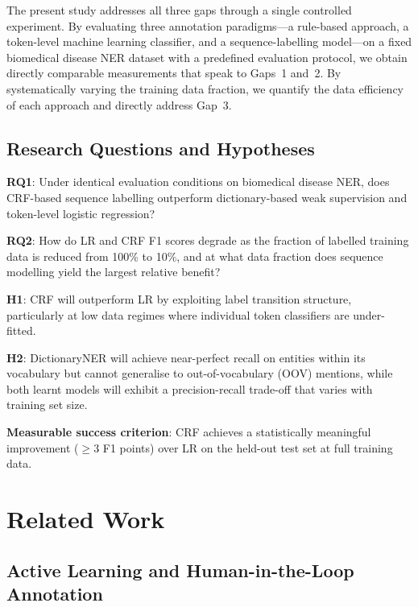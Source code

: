 \documentclass[sigconf,nonacm]{acmart}
\begin{document}
The present study addresses all three gaps through a single controlled experiment. By evaluating three annotation paradigms---a rule-based approach, a token-level machine learning classifier, and a sequence-labelling model---on a fixed biomedical disease NER dataset with a predefined evaluation protocol, we obtain directly comparable measurements that speak to Gaps~1 and~2. By systematically varying the training data fraction, we quantify the data efficiency of each approach and directly address Gap~3.

\subsection{Research Questions and Hypotheses}

\textbf{RQ1}: Under identical evaluation conditions on biomedical disease NER, does CRF-based sequence labelling outperform dictionary-based weak supervision and token-level logistic regression?

\textbf{RQ2}: How do LR and CRF F1 scores degrade as the fraction of labelled training data is reduced from 100\% to 10\%, and at what data fraction does sequence modelling yield the largest relative benefit?

\textbf{H1}: CRF will outperform LR by exploiting label transition structure, particularly at low data regimes where individual token classifiers are under-fitted.

\textbf{H2}: DictionaryNER will achieve near-perfect recall on entities within its vocabulary but cannot generalise to out-of-vocabulary (OOV) mentions, while both learnt models will exhibit a precision-recall trade-off that varies with training set size.

\textbf{Measurable success criterion}: CRF achieves a statistically meaningful improvement ($\geq$3 F1 points) over LR on the held-out test set at full training data.

\section{Related Work}

\subsection{Active Learning and Human-in-the-Loop Annotation}
\end{document}
